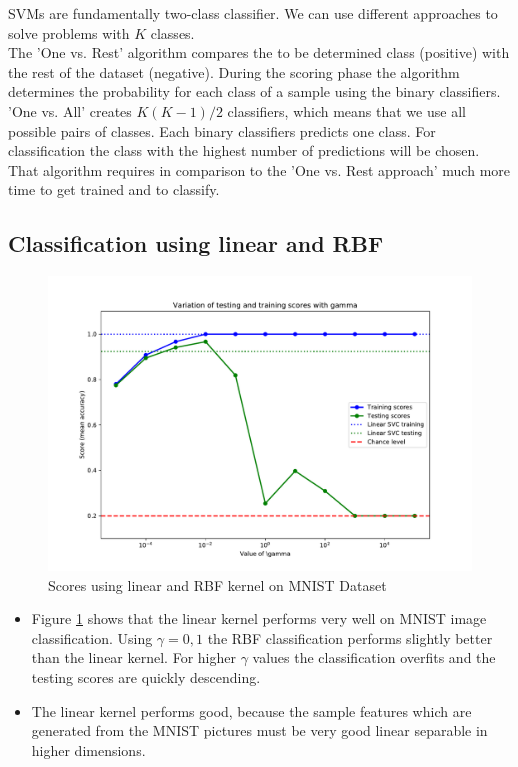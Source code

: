 \documentclass{article}
\begin{document}
SVMs are fundamentally two-class classifier. We can use different approaches to solve problems with $K$ classes. \\
The 'One vs. Rest' algorithm compares the to be determined class (positive) with the rest of the dataset (negative). During the scoring phase the algorithm determines the probability for each class of a sample using the binary classifiers.\\
'One vs. All' creates $K(K-1)/2$ classifiers, which means that we use all possible pairs of classes. Each binary classifiers predicts one class. For classification the class with the highest number of predictions will be chosen. That algorithm requires in comparison to the 'One vs. Rest approach' much more time to get trained and to classify.

\newpage

\subsection{Classification using linear and RBF}

\begin{figure}[!ht]
	\centering
	\includegraphics[width=.8\textwidth]{./Figures/3a_score.pdf}
	\caption{Scores using linear and RBF kernel on MNIST Dataset}
	\label{multiclass_classification}
\end{figure}

\begin{itemize}

	\item Figure \ref{multiclass_classification} shows that the linear kernel performs very well on MNIST image classification. Using $\gamma = 0,1$ the RBF classification performs slightly better than the linear kernel. For higher $\gamma$ values the classification overfits and the testing scores are quickly descending.
	
	\item The linear kernel performs good, because the sample features which are generated from the MNIST pictures must be very good linear separable in higher dimensions. 

\end{itemize}
\end{document}
